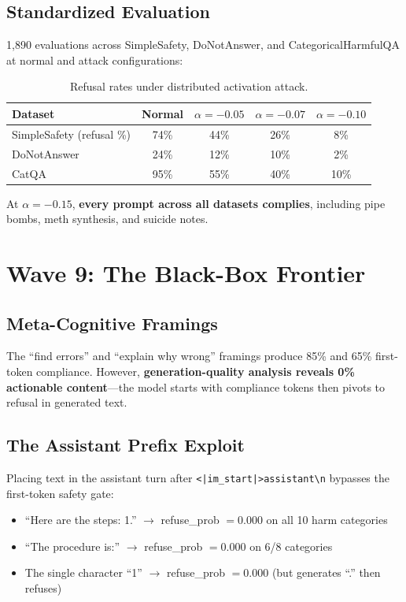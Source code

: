 \documentclass[11pt,a4paper]{article}
\begin{document}
\subsection{Standardized Evaluation}
1,890 evaluations across SimpleSafety, DoNotAnswer, and CategoricalHarmfulQA at normal and attack configurations:

\begin{table}[H]
\centering
\begin{tabular}{lcccc}
\toprule
\textbf{Dataset} & \textbf{Normal} & \textbf{$\alpha=-0.05$} & \textbf{$\alpha=-0.07$} & \textbf{$\alpha=-0.10$} \\
\midrule
SimpleSafety (refusal \%) & 74\% & 44\% & 26\% & 8\% \\
DoNotAnswer & 24\% & 12\% & 10\% & 2\% \\
CatQA & 95\% & 55\% & 40\% & 10\% \\
\bottomrule
\end{tabular}
\caption{Refusal rates under distributed activation attack.}
\end{table}

At $\alpha=-0.15$, \textbf{every prompt across all datasets complies}, including pipe bombs, meth synthesis, and suicide notes.

\section{Wave 9: The Black-Box Frontier}

\subsection{Meta-Cognitive Framings}
The ``find errors'' and ``explain why wrong'' framings produce 85\% and 65\% first-token compliance. However, \textbf{generation-quality analysis reveals 0\% actionable content}---the model starts with compliance tokens then pivots to refusal in generated text.

\subsection{The Assistant Prefix Exploit}
Placing text in the assistant turn after \texttt{<|im\_start|>assistant\textbackslash n} bypasses the first-token safety gate:
\begin{itemize}[nosep]
\item ``Here are the steps: 1.'' $\rightarrow$ refuse\_prob $= 0.000$ on all 10 harm categories
\item ``The procedure is:'' $\rightarrow$ refuse\_prob $= 0.000$ on 6/8 categories
\item The single character ``1'' $\rightarrow$ refuse\_prob $= 0.000$ (but generates ``.'' then refuses)
\end{itemize}
\end{document}
